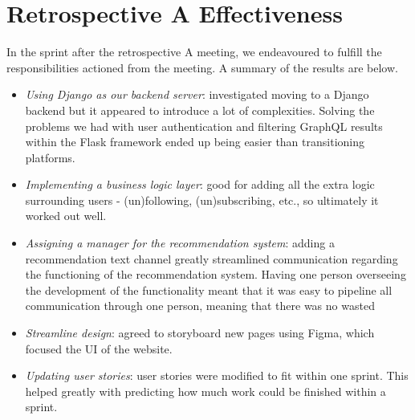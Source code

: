 \documentclass[12pt]{article}
\begin{document}
\section{Retrospective A Effectiveness}

In the sprint after the retrospective A meeting, we endeavoured to fulfill the responsibilities actioned from the meeting.
A summary of the results are below.

\begin{itemize}
  \item \emph{Using Django as our backend server}: investigated moving to a Django backend but it appeared to introduce a lot of complexities.
        Solving the problems we had with user authentication and filtering GraphQL results within the Flask framework ended up being easier than transitioning platforms.
  \item \emph{Implementing a business logic layer}: good for adding all the extra logic surrounding users - (un)following, (un)subscribing, etc., so ultimately it worked out well.
  \item \emph{Assigning a manager for the recommendation system}: adding a recommendation text channel greatly streamlined communication regarding the functioning of the recommendation system.
        Having one person overseeing the development of the functionality meant that it was easy to pipeline all communication through one person, meaning that there was no wasted
  \item \emph{Streamline design}: agreed to storyboard new pages using Figma, which focused the UI of the website.
  \item \emph{Updating user stories}: user stories were modified to fit within one sprint.
        This helped greatly with predicting how much work could be finished within a sprint.
\end{itemize}
\end{document}
